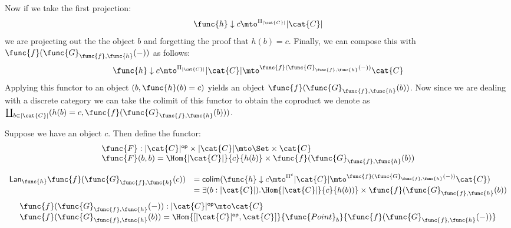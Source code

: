 Now if we take the first projection:
\[
    \func{h} \downarrow c \mto^{\Pi_{|\cat{C}|}} |\cat{C}|
\]
we are projecting out the the object $b$ and forgetting the proof
that $h(b) = c$.  Finally, we can compose this with
$\func{f}(\func{G}_{\func{f},\func{h}}(-))$ as follows:
\[
    \func{h} \downarrow c \mto^{\Pi_{|\cat{C}|}} |\cat{C}| \mto^{\func{f}(\func{G}_{\func{f},\func{h}}(-))} \cat{C}
\]
Applying this functor to an object $(b, \func{h}(b) = c)$ yields an
object $\func{f}(\func{G}_{\func{f},\func{h}}(b))$.  Now since we are
dealing with a discrete category we can take the colimit of this
functor to obtain the coproduct we denote as $\coprod_{b \in |\cat{C}|}(h(b) = c,\func{f}(\func{G}_{\func{f},\func{h}}(b)))$.

\noindent
Suppose we have an object $c$.  Then define the functor:
\[
    \begin{array}{lll}
        \func{F} : |\cat{C}|^{\mathsf{op}} \times |\cat{C}| \mto \Set \times \cat{C}\\
        \func{F}(b,b) = \Hom{|\cat{C}|}{c}{h(b)} \times \func{f}(\func{G}_{\func{f},\func{h}}(b))
    \end{array}
\]

\[
\begin{array}{lll}
    \Lan{\func{h}}{\func{f}(\func{G}_{\func{f},\func{h}}(c))} 
    & = \mathsf{colim}(\func{h}\downarrow c \mto^{\Pi^c} |\cat{C}| \mto^{\func{f}(\func{G}_{\func{f},\func{h}}(-))} \cat{C})\\    
    & = \exists(b : |\cat{C}|).\Hom{|\cat{C}|}{c}{h(b))} \times \func{f}(\func{G}_{\func{f},\func{h}}(b))\\    
\end{array}
\]
\[
  \begin{array}{lll}
    \func{f}(\func{G}_{\func{f},\func{h}}(-)) : |\cat{C}|^{\mathsf{op}} \mto \cat{C}\\
    \func{f}(\func{G}_{\func{f},\func{h}}(b)) = \Hom{[|\cat{C}|^{\mathsf{op}},\cat{C}]}{\func{Point}_b}{\func{f}(\func{G}_{\func{f},\func{h}}(-))}
  \end{array}  
\]  

